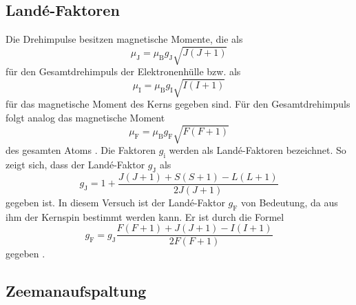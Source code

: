 \subsection{Landé-Faktoren}

Die Drehimpulse besitzen magnetische Momente, die als 
\begin{equation}
    \mu_{\text{J}} = \mu_{\text{B}} g_{\text{J}} \sqrt{J(J+1)}
\end{equation}
für den Gesamtdrehimpuls der Elektronenhülle bzw. als 
\begin{equation}
    \mu_{\text{I}} = \mu_{\text{B}} g_{\text{I}} \sqrt{I(I+1)}
\end{equation}
für das magnetische Moment des Kerns gegeben sind.
Für den Gesamtdrehimpuls folgt analog das magnetische Moment 
\begin{equation}
    \mu_{\text{F}} = \mu_{\text{B}} g_{\text{F}} \sqrt{F(F+1)}
\end{equation}
des gesamten Atoms \cite{1}.
Die Faktoren $g_{\text{i}}$ werden als Landé-Faktoren bezeichnet.
So zeigt sich, dass der Landé-Faktor $g_{\text{J}}$
als 
\begin{equation}
    g_{\text{J}} = 1+ \frac{J(J+1) +S(S+1) -L(L+1)}{2J(J+1)}
\end{equation}
gegeben ist.
In diesem Versuch ist der Landé-Faktor $g_{\text{F}}$ von Bedeutung, da
aus ihm der Kernspin bestimmt werden kann. 
Er ist durch die Formel
\begin{equation}
    g_{\text{F}} = g_{\text{J}} \frac{F(F+1) + J(J+1) - I(I+1)}{2F(F+1)} 
    \label{eq1}
\end{equation}
gegeben \cite{2}. 

\subsection{Zeemanaufspaltung} 


